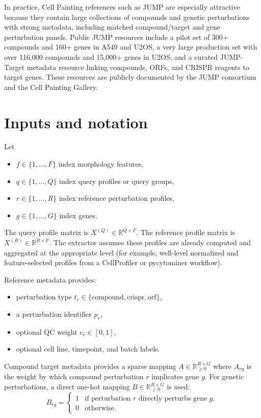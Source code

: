 \documentclass[11pt]{article}
\begin{document}
In practice, Cell Painting references such as JUMP are especially attractive because they contain large collections of compounds and genetic perturbations with strong metadata, including matched compound/target and gene perturbation panels. Public JUMP resources include a pilot set of 300+ compounds and 160+ genes in A549 and U2OS, a very large production set with over 116,000 compounds and 15,000+ genes in U2OS, and a curated JUMP-Target metadata resource linking compounds, ORFs, and CRISPR reagents to target genes. These resources are publicly documented by the JUMP consortium and the Cell Painting Gallery. \cite{jump_main,jump_gallery,jump_target,jump_pilot,jump_morphmap}

\section{Inputs and notation}
Let
\begin{itemize}[leftmargin=2em]
\item $f \in \{1,\dots,F\}$ index morphology features,
\item $q \in \{1,\dots,Q\}$ index query profiles or query groups,
\item $r \in \{1,\dots,R\}$ index reference perturbation profiles,
\item $g \in \{1,\dots,G\}$ index genes.
\end{itemize}

The query profile matrix is $X^{(Q)} \in \mathbb{R}^{Q \times F}$.
The reference profile matrix is $X^{(R)} \in \mathbb{R}^{R \times F}$.
The extractor assumes these profiles are already computed and aggregated at the appropriate level (for example, well-level normalized and feature-selected profiles from a CellProfiler or pycytominer workflow).

Reference metadata provides:
\begin{itemize}[leftmargin=2em]
\item perturbation type $t_r \in \{\mathrm{compound}, \mathrm{crispr}, \mathrm{orf}\}$,
\item a perturbation identifier $p_r$,
\item optional QC weight $c_r \in [0,1]$,
\item optional cell line, timepoint, and batch labels.
\end{itemize}

Compound target metadata provides a sparse mapping $A \in \mathbb{R}_{\ge 0}^{R \times G}$ where $A_{rg}$ is the weight by which compound perturbation $r$ implicates gene $g$. For genetic perturbations, a direct one-hot mapping $B \in \mathbb{R}_{\ge 0}^{R \times G}$ is used:
\[
B_{rg} =
\begin{cases}
1 & \text{if perturbation } r \text{ directly perturbs gene } g, \\
0 & \text{otherwise.}
\end{cases}
\]
\end{document}
